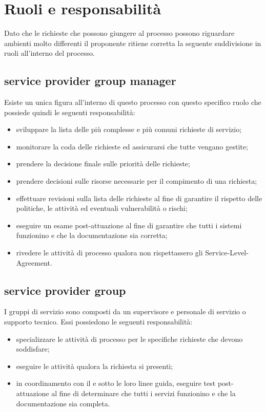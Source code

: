 %
%
\section[Ruoli e responsabilità]{Ruoli e responsabilità}
\label{rf-roles}
Dato che le richieste che possono giungere al processo possono riguardare ambienti molto differenti il proponente ritiene corretta la seguente suddivisione in ruoli all'interno del processo.

\subsection[Service Provider Group Manager]{service provider group manager}
\label{rf-roles-spgm}
Esiste un unica figura all'interno di questo processo con questo specifico ruolo che possiede quindi le seguenti responsabilità:

\begin{itemize}
\item{sviluppare la lista delle più complesse e più comuni richieste di servizio;}
\item{monitorare la coda delle richieste ed assicurarsi che tutte vengano gestite;}
\item{prendere la decisione finale sulle priorità delle richieste;}
\item{prendere decisioni sulle risorse necessarie per il compimento di una richiesta;}
\item{effettuare revisioni sulla lista delle richieste al fine di garantire il rispetto delle politiche, le attività ed eventuali vulnerabilità o rischi;}
\item{eseguire un esame post-attuazione al fine di garantire che tutti i sistemi funzionino e che la documentazione sia corretta;}
\item{rivedere le attività di processo qualora non rispettassero gli \ac{Service-Level-Agreement}.}
\end{itemize}

\subsection[Service Provider Group]{service provider group}
\label{rf-roles-spg}
I gruppi di servizio sono composti da un supervisore e personale di servizio o supporto tecnico. Essi possiedono le seguenti responsabilità:

\begin{itemize}
\item{specializzare le attività di processo per le specifiche richieste che devono soddisfare;}
\item{eseguire le attività qualora la richiesta si presenti;}
\item{in coordinamento con il  e sotto le loro linee guida, eseguire test post-attuazione al fine di determinare che tutti i servizi funzionino e che la documentazione sia completa.}
\end{itemize}